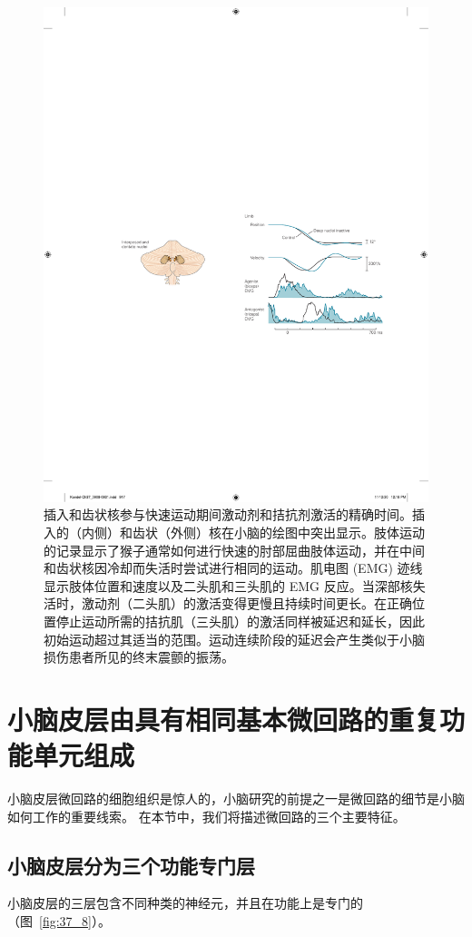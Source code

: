 \begin{figure}[htbp]
	\centering
	\includegraphics[width=0.5\linewidth]{chap37/fig_37_7}
	\caption{插入和齿状核参与快速运动期间激动剂和拮抗剂激活的精确时间。插入的（内侧）和齿状（外侧）核在小脑的绘图中突出显示。肢体运动的记录显示了猴子通常如何进行快速的肘部屈曲肢体运动，并在中间和齿状核因冷却而失活时尝试进行相同的运动。肌电图 (EMG) 迹线显示肢体位置和速度以及二头肌和三头肌的 EMG 反应。当深部核失活时，激动剂（二头肌）的激活变得更慢且持续时间更长。在正确位置停止运动所需的拮抗肌（三头肌）的激活同样被延迟和延长，因此初始运动超过其适当的范围。运动连续阶段的延迟会产生类似于小脑损伤患者所见的终末震颤的振荡。}
	\label{fig:37_7}
\end{figure}



\section{小脑皮层由具有相同基本微回路的重复功能单元组成}

小脑皮层微回路的细胞组织是惊人的，小脑研究的前提之一是微回路的细节是小脑如何工作的重要线索。
在本节中，我们将描述微回路的三个主要特征。



\subsection{小脑皮层分为三个功能专门层}

小脑皮层的三层包含不同种类的神经元，并且在功能上是专门的（图~\ref{fig:37_8}）。


